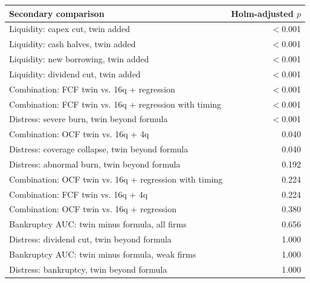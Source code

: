 \begin{tabular}{lr}
\toprule
Secondary comparison & Holm-adjusted $p$ \\
\midrule
Liquidity: capex cut, twin added & $<$0.001 \\
Liquidity: cash halves, twin added & $<$0.001 \\
Liquidity: new borrowing, twin added & $<$0.001 \\
Liquidity: dividend cut, twin added & $<$0.001 \\
Combination: FCF twin vs. 16q + regression & $<$0.001 \\
Combination: FCF twin vs. 16q + regression with timing & $<$0.001 \\
Distress: severe burn, twin beyond formula & $<$0.001 \\
Combination: OCF twin vs. 16q + 4q & 0.040 \\
Distress: coverage collapse, twin beyond formula & 0.040 \\
Distress: abnormal burn, twin beyond formula & 0.192 \\
Combination: OCF twin vs. 16q + regression with timing & 0.224 \\
Combination: FCF twin vs. 16q + 4q & 0.224 \\
Combination: OCF twin vs. 16q + regression & 0.380 \\
Bankruptcy AUC: twin minus formula, all firms & 0.656 \\
Distress: dividend cut, twin beyond formula & 1.000 \\
Bankruptcy AUC: twin minus formula, weak firms & 1.000 \\
Distress: bankruptcy, twin beyond formula & 1.000 \\
\bottomrule
\end{tabular}
